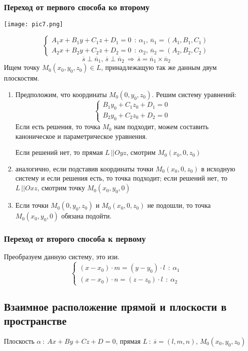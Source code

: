 \documentclass{article}
\begin{document}
\subsubsection{Переход от первого способа ко второму}
\begin{center}
    \texttt{[image: pic7.png]}
\end{center}
$$ \begin{cases}A_1x+B_1y+C_1z+D_1=0\:\::\:\alpha_1,\,\overline{n}_1=(A_1,B_1,C_1)\\A_2x+B_2y+C_2z+D_2=0\:\::\:\alpha_2,\,\overline{n}_2=(A_2,B_2,C_2) \end{cases}$$
$$ \overline{s}\perp\overline{n}_1,\,\overline{s}\perp\overline{n}_2\,\Rightarrow\,\overline{s}=\overline{n}_1\times\overline{n}_2 $$
Ищем точку $M_0(x_0,y_0,z_0)\in L$, принадлежащую так же данным двум плоскостям.
\begin{enumerate}
    \item Предположим, что координаты $M_0(0,y_0,z_0)$. Решим систему уравнений:
    $$ \begin{cases}B_1y_0+C_1z_0+D_1=0\\B_2y_0+C_2z_0+D_2=0 \end{cases} $$
    Если есть решения, то точка $M_0$ нам подходит, можем составить каноническое и параметрическое уравнения.

    Если решений нет, то прямая $L\,||Oyz$, смотрим $M_0(x_0,0,z_0)$
    \item аналогично, если подставив координаты точки $M_0(x_0,0,z_0)$ в исходную систему и если решения есть, то точка подходит; если решений нет, то $L\,||Oxz$, смотрим точку $M_0(x_0,y_0,0)$
    \item Если точки $M_0(0,y_0,z_0)$ и $M_0(x_0,0,z_0)$ не подошли, то точка $M_0(x_0,y_0,0)$ обязана подойти.
\end{enumerate}
\subsubsection{Переход от второго способа к первому}
Преобразуем данную систему, это изи.
$$ \begin{cases}(x-x_0)\cdot m=(y-y_0)\cdot l\:\::\:\alpha_1\\(x-x_0)\cdot n=(z-z_0)\cdot l\:\::\:\alpha_2\end{cases} $$
\newpage
\subsection{Взаимное расположение прямой и плоскости в пространстве}
Плоскость $\alpha\::\:Ax+By+Cz+D=0$, прямая $L\::\:\overline{s}=(l,m,n),\,M_0(x_0,y_0,z_0)$
\end{document}
